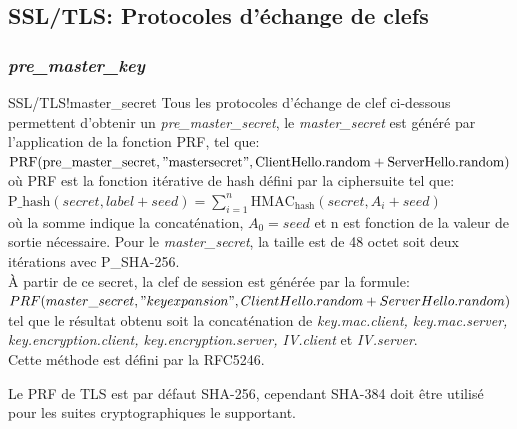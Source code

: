 \documentclass[twoside,a4paper,12pt,titlepage]{book}
\begin{document}
\subsection{SSL/TLS: Protocoles d'échange de clefs}
\subsubsection{\textit{pre\_master\_key}}
\begin{Define}{SSL/TLS!master\_secret}
Tous les protocoles d'échange de clef ci-dessous permettent d'obtenir un  \textit{pre\_master\_secret}, le \textit{master\_secret} est généré par l'application de la fonction PRF, tel que:\\ $\mathrm{PRF}(\mathrm{pre\_master\_secret}, \mathrm{"master secret"},\mathrm{ClientHello.random}+\mathrm{ServerHello.random})$\\ où PRF est la fonction itérative de hash défini par la ciphersuite tel que:\\ $\mathrm{P\_hash}(secret,label+seed)= \sum\limits_{i=1}^n \mathrm{HMAC_{hash}}(secret,A_i+seed)$\\où la somme indique la concaténation, $A_0=seed$ et n est fonction de la valeur de sortie nécessaire. Pour le \textit{master\_secret}, la taille est de 48 octet soit deux itérations avec P\_SHA-256.\\
\`A partir de ce secret, la clef de session est générée par la formule:\\%
$PRF(master\_secret, "key expansion",ClientHello.random + ServerHello.random)$\\
tel que le résultat obtenu soit la concaténation de \textit{key.mac.client, key.mac.server, key.encryption.client, key.encryption.server, IV.client} et \textit{IV.server}.\\
Cette méthode est défini par la RFC5246.
\end{Define}
Le PRF de TLS est par défaut SHA-256, cependant SHA-384 doit être utilisé pour les suites cryptographiques le supportant.
\end{document}

